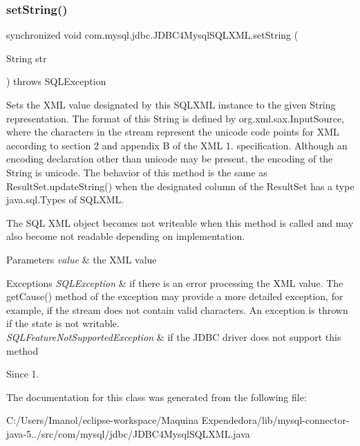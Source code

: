 \subsubsection{\texorpdfstring{set\+String()}{setString()}}
{\footnotesize\ttfamily synchronized void com.\+mysql.\+jdbc.\+J\+D\+B\+C4\+Mysql\+S\+Q\+L\+X\+M\+L.\+set\+String (\begin{DoxyParamCaption}\item[{String}]{str }\end{DoxyParamCaption}) throws S\+Q\+L\+Exception}

Sets the X\+ML value designated by this S\+Q\+L\+X\+ML instance to the given String representation. The format of this String is defined by org.\+xml.\+sax.\+Input\+Source, where the characters in the stream represent the unicode code points for X\+ML according to section 2 and appendix B of the X\+ML 1. specification. Although an encoding declaration other than unicode may be present, the encoding of the String is unicode. The behavior of this method is the same as Result\+Set.\+update\+String() when the designated column of the Result\+Set has a type java.\+sql.\+Types of S\+Q\+L\+X\+ML. 

The S\+QL X\+ML object becomes not writeable when this method is called and may also become not readable depending on implementation.


\begin{DoxyParams}{Parameters}
{\em value} & the X\+ML value \\
\hline
\end{DoxyParams}

\begin{DoxyExceptions}{Exceptions}
{\em S\+Q\+L\+Exception} & if there is an error processing the X\+ML value. The get\+Cause() method of the exception may provide a more detailed exception, for example, if the stream does not contain valid characters. An exception is thrown if the state is not writable. \\
\hline
{\em S\+Q\+L\+Feature\+Not\+Supported\+Exception} & if the J\+D\+BC driver does not support this method \\
\hline
\end{DoxyExceptions}
\begin{DoxySince}{Since}
1. 
\end{DoxySince}


The documentation for this class was generated from the following file\+:\begin{DoxyCompactItemize}
\item 
C\+:/\+Users/\+Imanol/eclipse-\/workspace/\+Maquina Expendedora/lib/mysql-\/connector-\/java-\/5../src/com/mysql/jdbc/J\+D\+B\+C4\+Mysql\+S\+Q\+L\+X\+M\+L.\+java\end{DoxyCompactItemize}
